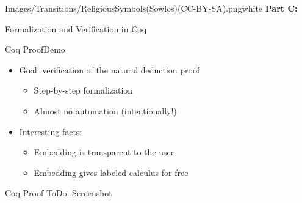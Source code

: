 \begin{transitionframe}{Images/Transitions/ReligiousSymbols(Sowlos)(CC-BY-SA).png}{white}
\textbf{Part C:}

Formalization and Verification in Coq
\end{transitionframe}

\begin{frame}{Coq Proof}{Demo}
\begin{itemize}
\item \begin{LARGE} Goal: verification of the natural deduction proof \end{LARGE}
\begin{itemize}
\item \begin{large} Step-by-step formalization \end{large}
\pause
\item \begin{large} Almost no automation (intentionally!) \end{large}
\end{itemize}
%
\pause
\item \begin{LARGE} Interesting facts: \end{LARGE}
\begin{itemize}
\item \begin{large} Embedding is transparent to the user \end{large}
\pause
\item \begin{large} Embedding gives labeled calculus for free \end{large}
\end{itemize}
\end{itemize}
\end{frame}

\begin{frame}{Coq Proof}
ToDo: Screenshot
\end{frame}
